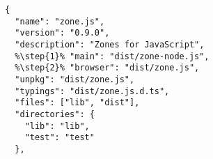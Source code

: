 \begin{verbatim}
{
  "name": "zone.js",
  "version": "0.9.0",
  "description": "Zones for JavaScript",
  %\step{1}% "main": "dist/zone-node.js",
  %\step{2}% "browser": "dist/zone.js",
  "unpkg": "dist/zone.js",
  "typings": "dist/zone.js.d.ts",
  "files": ["lib", "dist"],
  "directories": {
    "lib": "lib",
    "test": "test"
  },
\end{verbatim}
